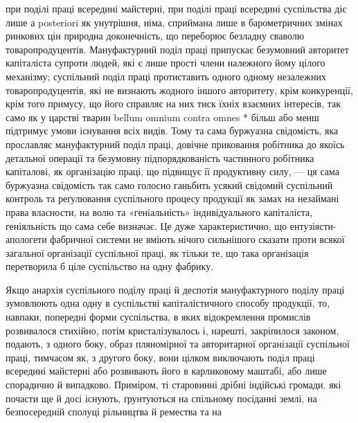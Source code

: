 \parcont{}  %
при поділі праці всередині майстерні, при поділі праці всередині
суспільства діє лише а posteriori як унутрішня, німа, сприймана
лише в барометричних змінах ринкових цін природна доконечність,
що переборює безладну сваволю товаропродуцентів. Мануфактурний
поділ праці припускає безумовний авторитет капіталіста
супроти людей, які є лише прості члени належного йому цілого
механізму; суспільний поділ праці протиставить одного одному
незалежних товаропродуцентів, які не визнають жодного іншого
авторитету, крім конкуренції, крім того примусу, що його справляє
на них тиск їхніх взаємних інтересів, так само як у царстві
тварин bellum omnium contra omnes * більш або менш підтримує
умови існування всіх видів. Тому та сама буржуазна свідомість,
яка прославляє мануфактурний поділ праці, довічне приковання
робітника до якоїсь детальної операції та безумовну підпорядкованість
частинного робітника капіталові, як організацію
праці, що підвищує її продуктивну силу, — ця сама буржуазна
свідомість так само голосно ганьбить усякий свідомий суспільний
контроль та реґулювання суспільного процесу продукції як замах
на незаймані права власности, на волю та «геніальність» індивідуального
капіталіста, геніяльність що сама себе визначає.
Це дуже характеристично, що ентузіясти-апологети фабричної
системи не вміють нічого сильнішого сказати проти всякої загальної
організації суспільної праці, як тільки те, що така організація
перетворила б ціле суспільство на одну фабрику.

Якщо анархія суспільного поділу праці й деспотія мануфактурного
поділу праці зумовлюють одна одну в суспільстві капіталістичного
способу продукції, то, навпаки, попередні форми
суспільства, в яких відокремлення промислів розвивалося стихійно,
потім кристалізувалось і, нарешті, закріпилося законом,
подають, з одного боку, образ пляномірної та авторитарної
організації суспільної праці, тимчасом як, з другого боку, вони
цілком виключають поділ праці всередині майстерні або розвивають
його в карликовому маштабі, або лише спорадично й випадково.
Приміром, ті старовинні дрібні індійські громади, які почасти
ще й досі існують, ґрунтуються на спільному посіданні
землі, на безпосередній сполуці рільництва й ремества та на
\parbreak{}  %
